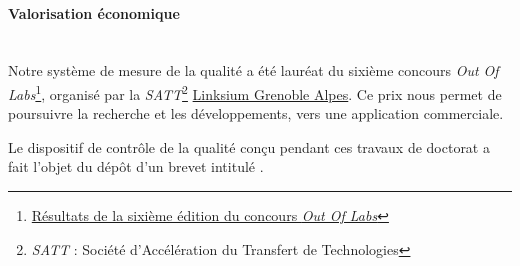 \bigskip

\paragraph{Valorisation économique}\mbox{} \\

Notre système de mesure de la qualité a été lauréat du sixième concours \textit{Out Of Labs}\footnote{\href{http://outoflabs.linksium.fr/resultats/}{Résultats de la sixième édition du concours \textit{Out Of Labs}}}, organisé par la \textit{SATT}\footnote{\textit{SATT} : Société d'Accélération du Transfert de Technologies} \href{https://www.linksium.fr/}{Linksium Grenoble Alpes}.
Ce prix nous permet de poursuivre la recherche et les développements, vers une application commerciale.

Le dispositif de contrôle de la qualité conçu pendant ces travaux de doctorat a fait l'objet du dépôt d'un brevet intitulé  \cite{nagorny_dispositif_2019}.
